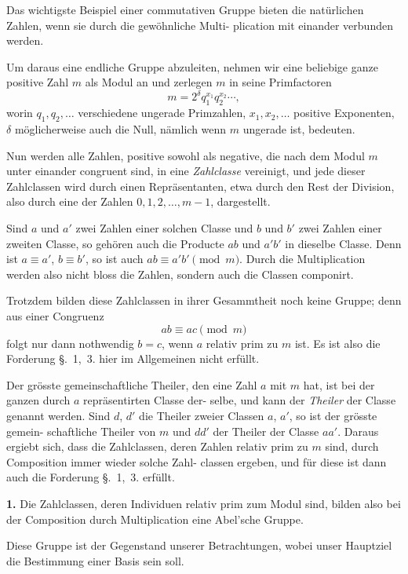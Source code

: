 \documentclass[12pt,a4paper]{article}
\theoremstyle{plain}
\theoremstyle{definition}
\theoremstyle{remark}
\begin{document}
Das wichtigste Beispiel einer commutativen Gruppe bieten
die natürlichen Zahlen, wenn sie durch die gewöhnliche Multi-
plication mit einander verbunden werden.

Um daraus eine endliche Gruppe abzuleiten, nehmen wir
eine beliebige ganze positive Zahl $m$ als Modul an und zerlegen
$m$ in seine Primfactoren
\begin{equation}\tag{1}
m = 2^\delta q_1^{x_1} q_2^{x_2} \cdots,
\end{equation}
worin $q_1, q_2, \ldots$ verschiedene ungerade Primzahlen, $x_1, x_2, \ldots$
positive Exponenten, $\delta$ möglicherweise auch die Null, nämlich
wenn $m$ ungerade ist, bedeuten.

Nun werden alle Zahlen, positive sowohl als negative, die
nach dem Modul $m$ unter einander congruent sind, in eine
\emph{Zahlclasse} vereinigt, und jede dieser Zahlclassen wird durch
einen Repräsentanten, etwa durch den Rest der Division, also
durch eine der Zahlen $0, 1, 2, \ldots, m-1$, dargestellt.

Sind $a$ und $a'$ zwei Zahlen einer solchen Classe und $b$ und $b'$
zwei Zahlen einer zweiten Classe, so gehören auch die Producte
$ab$ und $a'b'$ in dieselbe Classe. Denn ist $a \equiv a'$, $b \equiv b'$, so ist
auch $ab \equiv a'b' \pmod{m}$. Durch die Multiplication werden also
nicht bloss die Zahlen, sondern auch die Classen componirt.

Trotzdem bilden diese Zahlclassen in ihrer Gesammtheit
noch keine Gruppe; denn aus einer Congruenz
\[
ab \equiv ac \pmod{m}
\]
folgt nur dann nothwendig $b = c$, wenn $a$ relativ prim zu $m$
ist. Es ist also die Forderung \S.~1,~3. hier im Allgemeinen
nicht erfüllt.

Der grösste gemeinschaftliche Theiler, den eine Zahl $a$ mit
$m$ hat, ist bei der ganzen durch $a$ repräsentirten Classe der-
selbe, und kann der \emph{Theiler} der Classe genannt werden. Sind
$d$, $d'$ die Theiler zweier Classen $a$, $a'$, so ist der grösste gemein-
schaftliche Theiler von $m$ und $dd'$ der Theiler der Classe $aa'$.
Daraus ergiebt sich, dass die Zahlclassen, deren Zahlen relativ
prim zu $m$ sind, durch Composition immer wieder solche Zahl-
classen ergeben, und für diese ist dann auch die Forderung
\S.~1,~3. erfüllt.

\textbf{1.} Die Zahlclassen, deren Individuen relativ prim
zum Modul sind, bilden also bei der Composition
durch Multiplication eine Abel'sche Gruppe.

Diese Gruppe ist der Gegenstand unserer Betrachtungen,
wobei unser Hauptziel die Bestimmung einer Basis sein soll.
\end{document}
